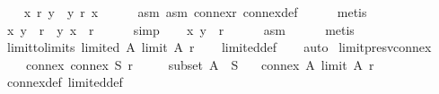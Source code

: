 \begin{isabellebody}
\ \ \isamarkupfalse%
\ {\isachardoublequoteopen}x\ {\isasympreceq}\isactrlsub r\ y\ {\isasymor}\ y\ {\isasympreceq}\isactrlsub r\ x{\isachardoublequoteclose}\isanewline
\ \ \ \ \isamarkupfalse%
\ asm{}\ asm{}\ connex{\isacharunderscore}{\kern0pt}r\ connex{\isacharunderscore}{\kern0pt}def\isanewline
\ \ \ \ \isamarkupfalse%
\ metis\isanewline
\ \ \isamarkupfalse%
\ {\isachardoublequoteopen}{\isacharparenleft}{\kern0pt}x{\isacharcomma}{\kern0pt}\ y{\isacharparenright}{\kern0pt}\ {\isasymin}\ r\ {\isasymor}\ {\isacharparenleft}{\kern0pt}y{\isacharcomma}{\kern0pt}\ x{\isacharparenright}{\kern0pt}\ {\isasymin}\ r{\isachardoublequoteclose}\isanewline
\ \ \ \ \isamarkupfalse%
\ simp\isanewline
\ \ \isamarkupfalse%
\ {\isachardoublequoteopen}{\isacharparenleft}{\kern0pt}x{\isacharcomma}{\kern0pt}\ y{\isacharparenright}{\kern0pt}\ {\isasymin}\ r{\isachardoublequoteclose}\isanewline
\ \ \ \ \isamarkupfalse%
\ asm{}\isanewline
\ \ \ \ \isamarkupfalse%
\ metis\isanewline
{}\isamarkupfalse%
%
\endisatagproof
{\isafoldproof}%
%
\isadelimproof
\isanewline
%
\endisadelimproof
\isanewline
{}\isamarkupfalse%
\ limit{\isacharunderscore}{\kern0pt}to{\isacharunderscore}{\kern0pt}limits{\isacharcolon}{\kern0pt}\ {\isachardoublequoteopen}limited\ A\ {\isacharparenleft}{\kern0pt}limit\ A\ r{\isacharparenright}{\kern0pt}{\isachardoublequoteclose}\isanewline
%
\isadelimproof
\ \ %
\endisadelimproof
%
\isatagproof
{}\isamarkupfalse%
\ limited{\isacharunderscore}{\kern0pt}def\isanewline
\ \ \isamarkupfalse%
\ auto%
\endisatagproof
{\isafoldproof}%
%
\isadelimproof
\isanewline
%
\endisadelimproof
\isanewline
{}\isamarkupfalse%
\ limit{\isacharunderscore}{\kern0pt}presv{\isacharunderscore}{\kern0pt}connex{\isacharcolon}{\kern0pt}\isanewline
\ \ \isanewline
\ \ \ \ connex{\isacharcolon}{\kern0pt}\ {\isachardoublequoteopen}connex\ S\ r{\isachardoublequoteclose}\ \isanewline
\ \ \ \ subset{\isacharcolon}{\kern0pt}\ {\isachardoublequoteopen}A\ {\isasymsubseteq}\ S{\isachardoublequoteclose}\isanewline
\ \ \ {\isachardoublequoteopen}connex\ A\ {\isacharparenleft}{\kern0pt}limit\ A\ r{\isacharparenright}{\kern0pt}{\isachardoublequoteclose}\isanewline
%
\isadelimproof
\ \ %
\endisadelimproof
%
\isatagproof
{}\isamarkupfalse%
\ connex{\isacharunderscore}{\kern0pt}def\ limited{\isacharunderscore}{\kern0pt}def\isanewline

\end{isabellebody}
